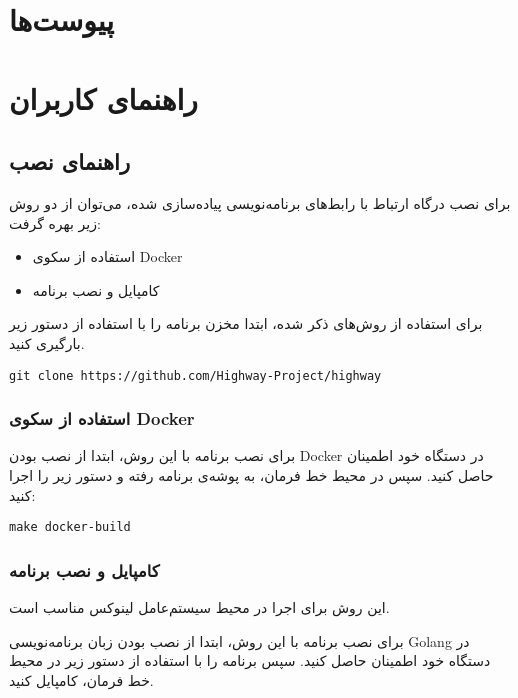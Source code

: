 \section{پیوست‌ها}\label{sec:attachments}



\section*{راهنمای کاربران}\label{subsec:manual}
\subsection*{راهنمای نصب}
برای نصب درگاه ارتباط با رابط‌های برنامه‌نویسی پیاده‌سازی شده، می‌توان از دو روش زیر بهره گرفت:

\begin{itemize}
    \item استفاده از سکوی Docker
    \item کامپایل و نصب برنامه
\end{itemize}

برای استفاده از روش‌های ذکر شده، ابتدا مخزن برنامه را با استفاده از دستور زیر بارگیری کنید.

\begin{latin}
    \begin{lstlisting}
git clone https://github.com/Highway-Project/highway
    \end{lstlisting}
\end{latin}


\subsubsection*{استفاده از سکوی Docker}
برای نصب برنامه با این روش، ابتدا از نصب بودن Docker در دستگاه خود اطمینان حاصل کنید. سپس در محیط خط فرمان، به پوشه‌ی برنامه رفته و دستور زیر را اجرا کنید:

\begin{latin}
    \begin{lstlisting}
make docker-build
    \end{lstlisting}
\end{latin}


\subsubsection*{کامپایل و نصب برنامه}
این روش برای اجرا در محیط سیستم‌عامل لینوکس مناسب است.

برای نصب برنامه با این روش، ابتدا از نصب بودن زبان برنامه‌نویسی Golang در دستگاه خود اطمینان حاصل کنید. سپس برنامه را با استفاده از دستور زیر در محیط خط فرمان، ‌کامپایل کنید.



